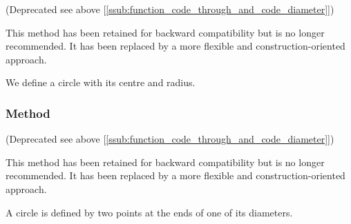 (Deprecated see above [\ref{ssub:function_code_through_and_code_diameter}])

This method has been retained for backward compatibility but is no longer recommended. It has been replaced by a more flexible and construction-oriented approach.

We define a circle with its centre and radius.

\vspace{1em}
\begin{tkzexample}[latex=.5\textwidth]
\begin{center}
\end{center}
\end{tkzexample}


\subsubsection{Method }
\label{ssub:method_circle_diameter}

(Deprecated see above [\ref{ssub:function_code_through_and_code_diameter}])

This method has been retained for backward compatibility but is no longer recommended. It has been replaced by a more flexible and construction-oriented approach.

A circle is defined by two points at the ends of one of its diameters.

\vspace{1em}
\begin{tkzexample}[latex=.5\textwidth]
\begin{center}
\end{center}
\end{tkzexample}

